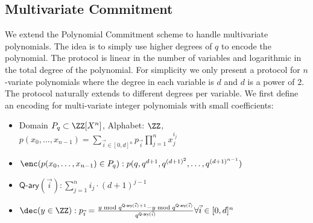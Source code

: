 \documentclass{article}
\begin{document}
\subsection{Multivariate Commitment}
  We extend the Polynomial Commitment scheme to handle multivariate polynomials. The idea is to simply use higher degrees of $q$ to encode the polynomial. The protocol is linear in the number of variables and logarithmic in the total degree of the polynomial. For simplicity we only present a protocol for $n$-variate polynomials where the degree in each variable is $d$ and $d$ is a power of $2$. The protocol naturally extends to different degrees per variable.
We first define an encoding for multi-variate integer polynomials with small coefficients:
 \begin{itemize}
	\item Domain $P_q \subset \ZZ[X^n]$, Alphabet: $\ZZ$, \\$p(x_0,\dots,x_{n-1})=\sum_{\vec{i} \in [0,d]^n} p_{\vec{i}} \prod_{j=1}^{n} x_j^{i_j}$
	\item $\enc(p(x_0,\dots,x_{n-1}) \in P_q): p(q,q^{d+1},q^{(d+1)^2},\dots,q^{(d+1)^{n-1}})$
	\item $\textsf{Q-ary}(\vec{i}):\sum_{j=1}^{n} i_j\cdot (d+1)^{j-1}$
	\item $\dec(y \in \ZZ): p_{\vec{i}}=\frac{y \bmod q^{\textsf{Q-ary}(\vec{i})+1}-y \bmod q^{\textsf{Q-ary}(\vec{i})}}{q^{\textsf{Q-ary}(\vec{i})}} \forall \vec{i} \in [0,d]^n$
\end{itemize}
\end{document}
